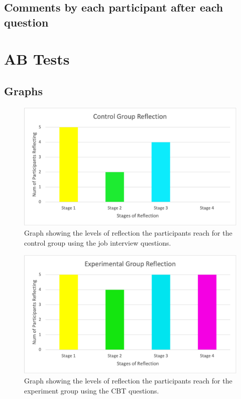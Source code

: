 \documentclass{l4proj}
\begin{document}
\begin{appendices}
\subsection{Comments by each participant after each question}



\section{AB Tests} \label{Appendix-ABTests}

\subsection{Graphs}

\begin{figure}[H]
    \begin{centering}
    \includegraphics[scale=0.5]{images/ABControlGraph.png}
    \caption{Graph showing the levels of reflection the participants reach for the control group using the job interview questions.}
    \label{fig: Appen-ControlGraph}
    \end{centering}
\end{figure}

\begin{figure}[H]
    \begin{centering}
    \includegraphics[scale=0.5]{images/ABExperimentGraph.png}
    \caption{Graph showing the levels of reflection the participants reach for the experiment group using the CBT questions.}
    \label{fig: Appen-ExperimentGraph}
    \end{centering}
\end{figure}


\end{appendices}
\end{document}
